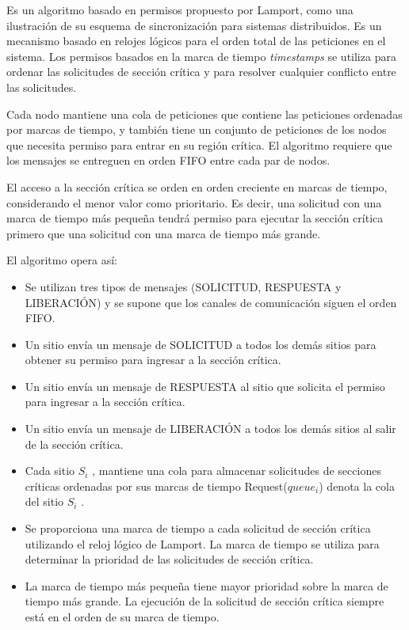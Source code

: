  
 Es un algoritmo basado en permisos propuesto por Lamport,  como una ilustración de su esquema de sincronización para sistemas distribuidos. Es un  mecanismo basado en relojes lógicos para el orden  total de las peticiones en el sistema.
 Los permisos basados en la marca de tiempo \textit{timestamps} se utiliza para ordenar las solicitudes de sección crítica y para resolver cualquier conflicto entre las solicitudes.
 
 Cada nodo  mantiene una cola de peticiones que contiene las
 peticiones ordenadas por marcas de tiempo, y
 también tiene un conjunto de peticiones de los nodos
 que necesita permiso para entrar en su región crítica.
 El algoritmo requiere que los mensajes se entreguen
 en orden FIFO entre cada par de nodos.   	
	
El acceso a la secci\'on cr\'itica se orden en orden creciente en marcas de tiempo, considerando el menor valor como prioritario.
Es decir, una solicitud con una marca de tiempo más pequeña tendrá permiso para ejecutar la sección crítica 	primero que una solicitud con una marca 	de tiempo más grande.
 
El algoritmo  opera as\'i:  
	\begin{itemize} 
		\item Se utilizan tres tipos de mensajes (SOLICITUD,
		RESPUESTA y LIBERACIÓN) y se supone que los
		canales de comunicación siguen el orden FIFO.
		\item Un sitio envía un mensaje de SOLICITUD a todos los
		demás sitios para obtener su permiso para ingresar a
		la sección crítica.
		\item Un sitio envía un mensaje de RESPUESTA al sitio que
		solicita el permiso para ingresar a la sección crítica.
		\item Un sitio envía un mensaje de LIBERACIÓN a todos los
		demás sitios al salir de la sección crítica.

		\item Cada sitio $S_{i}$ , mantiene una cola para almacenar
		solicitudes de secciones críticas ordenadas por sus
		marcas de tiempo Request($queue_{i}$) denota la cola del sitio 	$S_{i}$ .
		\item Se proporciona una marca de tiempo a cada solicitud de 	sección crítica utilizando el reloj lógico de Lamport. La marca de tiempo se utiliza para determinar la
		prioridad de las solicitudes de sección crítica. 
		\item La marca de tiempo más pequeña tiene mayor prioridad sobre la 	marca de tiempo más grande. La ejecución de la solicitud de sección crítica siempre está en el orden de su marca de tiempo.
	\end{itemize}
 

